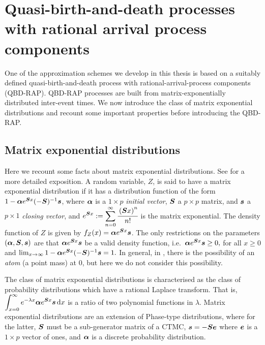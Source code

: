 \section{Quasi-birth-and-death processes with rational arrival process components}\label{qbd-rap intro}
One of the approximation schemes we develop in this thesis is based on a suitably defined quasi-birth-and-death process with rational-arrival-process components (QBD-RAP). QBD-RAP processes are built from matrix-exponentially distributed inter-event times. We now introduce the class of matrix exponential distributions and recount some important properties before introducing the QBD-RAP. 

\subsection{Matrix exponential distributions}
Here we recount some facts about matrix exponential distributions. See \cite{MEinAP} for a more detailed exposition. A random variable, \(Z\), is said to have a matrix exponential distribution if it has a distribution function of the form \(1-\boldsymbol \alpha e^{\boldsymbol Sx}(-\boldsymbol S)^{-1}\boldsymbol s\), where \(\boldsymbol \alpha\) is a \(1\times p\) \emph{initial vector}, \(\boldsymbol S\) a \(p\times p\) matrix, and \(\boldsymbol s\) a \(p\times 1\) \emph{closing vector}, and \(\displaystyle e^{\boldsymbol S x} := \sum_{n=0}^\infty \cfrac{\left(\boldsymbol Sx\right)^n}{n!}\) is the matrix exponential. The density function of \(Z\) is given by \(f_Z(x) = \boldsymbol\alpha e^{\boldsymbol S x}\boldsymbol s\). The only restrictions on the parameters \((\boldsymbol \alpha, \boldsymbol S, \boldsymbol s)\) are that \(\boldsymbol \alpha e^{\boldsymbol S x} \boldsymbol s\) be a valid density function, i.e.~\(\boldsymbol \alpha e^{\boldsymbol S x} \boldsymbol s\geq 0,\) for all \(x\geq 0\) and \(\lim_{x\to\infty} 1-\boldsymbol \alpha e^{\boldsymbol Sx}(-\boldsymbol S)^{-1}\boldsymbol s = 1.\) In general, in \cite{MEinAP}, there is the possibility of an \emph{atom} (a point mass) at 0, but here we do not consider this possibility. 

The class of matrix exponential distributions is characterised as the class of probability distributions which have a rational Laplace transform. That is, \(\displaystyle \int_{x=0}^\infty e^{-\lambda x}\boldsymbol \alpha e^{\boldsymbol S x}\boldsymbol s \, \mathrm{d} x\) is a ratio of two polynomial functions in \(\lambda\). Matrix exponential distributions are an extension of Phase-type distributions, where for the latter, \(\boldsymbol S\) must be a sub-generator matrix of a CTMC, \(\boldsymbol s = -\boldsymbol S\boldsymbol e\) where \(\boldsymbol e\) is a \(1\times p\) vector of ones, and \(\boldsymbol \alpha\) is a discrete probability distribution.  

